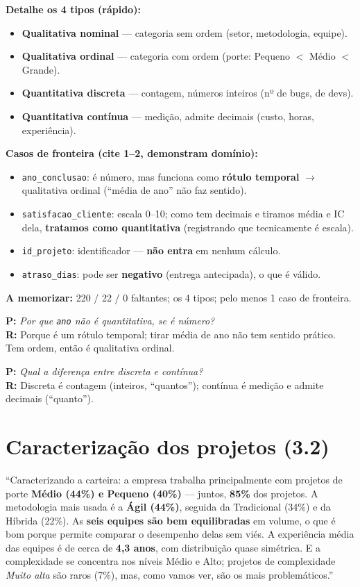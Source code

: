 \documentclass[a4paper, 11pt]{article}
\newcommand{\var}[1]{\texttt{#1}}
\newcommand{\pergunta}[2]{\par\smallskip\noindent\textbf{P:} \emph{#1}\\
  \textbf{R:} #2}
\begin{document}
\textbf{Detalhe os 4 tipos (rápido):}
\begin{itemize}[noitemsep]
	\item \textbf{Qualitativa nominal} --- categoria sem ordem (setor, metodologia, equipe).
	\item \textbf{Qualitativa ordinal} --- categoria com ordem (porte: Pequeno $<$ Médio $<$ Grande).
	\item \textbf{Quantitativa discreta} --- contagem, números inteiros (nº de bugs, de devs).
	\item \textbf{Quantitativa contínua} --- medição, admite decimais (custo, horas, experiência).
\end{itemize}

\textbf{Casos de fronteira (cite 1--2, demonstram domínio):}
\begin{itemize}[noitemsep]
	\item \var{ano\_conclusao}: é número, mas funciona como \textbf{rótulo temporal} $\to$
	      qualitativa ordinal (``média de ano'' não faz sentido).
	\item \var{satisfacao\_cliente}: escala 0--10; como tem decimais e tiramos média e IC dela,
	      \textbf{tratamos como quantitativa} (registrando que tecnicamente é escala).
	\item \var{id\_projeto}: identificador --- \textbf{não entra} em nenhum cálculo.
	\item \var{atraso\_dias}: pode ser \textbf{negativo} (entrega antecipada), o que é válido.
\end{itemize}

\textbf{A memorizar:} 220 / 22 / 0 faltantes; os 4 tipos; pelo menos 1 caso de fronteira.

\pergunta{Por que \var{ano} não é quantitativa, se é número?}{Porque é um rótulo temporal; tirar média de ano não tem sentido prático. Tem ordem, então é qualitativa ordinal.}
\pergunta{Qual a diferença entre discreta e contínua?}{Discreta é contagem (inteiros, ``quantos''); contínua é medição e admite decimais (``quanto'').}

\section{Caracterização dos projetos (3.2)}

\begin{roteiro}
``Caracterizando a carteira: a empresa trabalha principalmente com projetos de porte
\textbf{Médio (44\%) e Pequeno (40\%)} --- juntos, \textbf{85\%} dos projetos. A metodologia
mais usada é a \textbf{Ágil (44\%)}, seguida da Tradicional (34\%) e da Híbrida (22\%). As
\textbf{seis equipes são bem equilibradas} em volume, o que é bom porque permite comparar o
desempenho delas sem viés. A experiência média das equipes é de cerca de \textbf{4,3 anos}, com
distribuição quase simétrica. E a complexidade se concentra nos níveis Médio e Alto; projetos
de complexidade \emph{Muito alta} são raros (7\%), mas, como vamos ver, são os mais
problemáticos.''
\end{roteiro}
\end{document}
